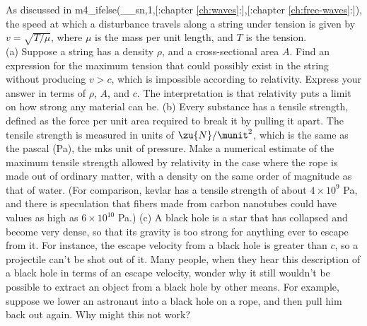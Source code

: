 As discussed in
m4_ifelse(__sn,1,[:chapter \ref{ch:waves}:],[:chapter \ref{ch:free-waves}:]), the speed at which a disturbance travels along
a string under tension is given by $v=\sqrt{T/\mu}$, where $\mu$ is the mass per unit
length, and $T$ is the tension.\\
 (a) Suppose a string has a density $\rho$, and a cross-sectional
area $A$. Find an expression for the maximum tension that could possibly exist in the string
without producing $v>c$, which is impossible according to relativity. Express your answer in
terms of $\rho$, $A$, and $c$. The interpretation is that relativity puts a limit on how
strong any material can be.\answercheck\hwendpart
(b) Every substance has a tensile strength, defined as the force
per unit area required to break it by pulling it apart. The tensile strength is measured in
units of $\zu{N}/\munit^2$, which is the same as the pascal (Pa), the mks unit of pressure.
Make a numerical estimate of the maximum tensile strength allowed by relativity in the case where
the rope is made out of ordinary matter, with a density on the same order of magnitude as
that of water. (For comparison, kevlar has a tensile strength of about $4\times10^9$ Pa,
and there is speculation that fibers made from carbon nanotubes could have
values as high as  $6\times10^{10}$ Pa.)\answercheck\hwendpart
(c) A black hole is a star that has collapsed and become very dense, so that
its gravity is too strong for anything ever to escape from it. For instance, the escape
velocity from a black hole is greater than $c$, so a projectile can't be shot out of it.
Many people, when they hear this description of a black hole in terms of an escape velocity,
wonder why it still wouldn't be possible to extract an object from a black
hole by other means.
For example, suppose we lower an astronaut into a black hole on a rope, and then pull him
back out again. Why might this not work?\hwendpart
